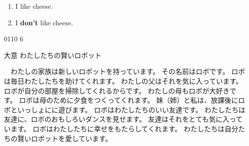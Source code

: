 \documentclass[aspectratio=169,xcolor={dvipsnames,table}]{beamer}
\begin{document}
\begin{frame}[plain]
 \hypertarget{DONOT}{}
\begin{enumerate}[<+->]
 \item I like cheese.
 \item I \textbf{don't} like cheese.
\end{enumerate}

\hfill{\tiny 0110}\,{\scriptsize {}\,6}


\hfill\hyperlink{reader}{}
\end{frame}
\begin{frame}[plain]{大意}
わたしたちの賢いロボット

\bigskip
 
　わたしの家族は新しいロボットを持っています。
その名前はロボです。
ロボは毎日わたしたちを助けてくれます。
わたしの父はそれを気に入っています。ロボが自分の部屋を掃除してくれるからです。
わたしの母もロボが大好きです。
ロボは母のために夕食をつくってくれます。
妹（姉）と私は、放課後にロボといっしょにに遊びます。
ロボはわたしたちのいい友達です。
わたしたちは友達に、ロボのおもしろいダンスを見せます。
友達はそれをとても気に入っています。
ロボはわたしたちに幸せをもたらしてくれます。
わたしたちは自分たちの賢いロボットを愛しています。
\end{frame}
\end{document}
